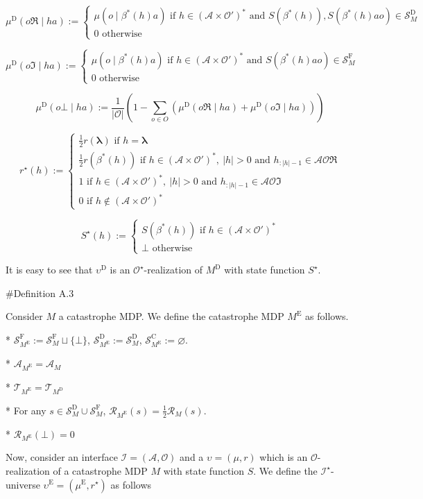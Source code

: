 \documentclass[a4paper]{article}
\newcommand{\AP}[1]{\left(#1\right)}
\newcommand{\Estr}{\boldsymbol{\lambda}}
\newcommand{\Abs}[1]{\left\vert #1 \right\vert}
\newcommand{\Ob}{\mathcal{O}}
\newcommand{\A}{\mathcal{A}}
\newcommand{\St}{\mathcal{S}}
\newcommand{\T}{\mathcal{T}}
\newcommand{\R}{\mathcal{R}}
\newcommand{\In}{\mathcal{I}}
\newcommand{\RMC}{\mathrm{C}}
\newcommand{\RMD}{\mathrm{D}}
\newcommand{\RME}{\mathrm{E}}
\newcommand{\RMF}{\mathrm{F}}
\newcommand{\SF}{\St^{\RMF}}
\newcommand{\SD}{\St^{\RMD}}
\newcommand{\SC}{\St^{\RMC}}
\newcommand{\MD}{M^{\RMD}}
\newcommand{\ME}{M^{\RME}}
\newcommand{\UD}{\upsilon^{\RMD}}
\begin{document}
$$\mu^\RMD(o\Re \mid ha) := \begin{cases} \mu\AP{o \mid \beta^*(h)a} \text{ if } h\in\AP{\A \times \Ob'}^* \text{ and } S\AP{\beta^*(h)},S\AP{\beta^*(h)ao}\in\SD_M \\ 0 \text{ otherwise} \end{cases}$$

$$\mu^\RMD(o\Im \mid ha) := \begin{cases} \mu\AP{o \mid \beta^*(h)a} \text{ if } h\in\AP{\A \times \Ob'}^* \text{ and } S\AP{\beta^*(h)ao}\in\SF_M \\ 0 \text{ otherwise} \end{cases}$$

$$\mu^\RMD(o\bot \mid ha) := \frac{1}{\Abs{\Ob}}\AP{1 - \sum_{o \in O} \AP{\mu^\RMD(o\Re \mid ha) + \mu^\RMD(o\Im \mid ha)}}$$

$$r^\star(h):=\begin{cases} \frac{1}{2}r(\Estr) \text{ if } h = \Estr \\ \frac{1}{2}r\AP{\beta^*(h)} \text{ if } h\in\AP{\A \times \Ob'}^*,\ \Abs{h}>0 \text{ and } h_{:\Abs{h}-1}\in\A\Ob\Re \\ 1 \text{ if } h\in\AP{\A \times \Ob'}^*,\ \Abs{h}>0 \text{ and } h_{:\Abs{h}-1}\in\A\Ob\Im \\ 0 \text{ if } h\not\in\AP{\A \times \Ob'}^* \end{cases}$$

$$S^\star(h):=\begin{cases} S\AP{\beta^*(h)} \text{ if } h\in\AP{\A \times \Ob'}^* \\ \bot \text{ otherwise} \end{cases}$$

It is easy to see that $\UD$ is an $\Ob^\star$-realization of $\MD$ with state function $S^\star$.

\#Definition A.3

Consider $M$ a catastrophe MDP. We define the catastrophe MDP $\ME$ as follows.

* $\SF_{\ME}:=\SF_M \sqcup \{\bot\}$, $\SD_{\ME}:=\SD_M$, $\SC_{\ME}:=\varnothing$.

* $\A_{\ME} = \A_M$

* $\T_{\ME} = \T_{\MD}$

* For any $s \in \SD_M \cup \SF_M$, $\R_{\ME}(s) = \frac{1}{2}\R_M(s)$.

* $\R_{\ME}(\bot) = 0$

Now, consider an interface $\In=(\A,\Ob)$ and a $\upsilon=(\mu,r)$ which is an $\Ob$-realization of a catastrophe MDP $M$ with state function $S$. We define the $\In^\star$-universe $\upsilon^\RME=(\mu^\RME,r^\star)$ as follows
\end{document}

